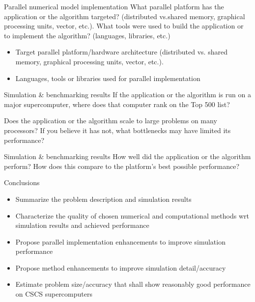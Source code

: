 \documentclass[aspectratio=43]{beamer}
\begin{document}
\begin{frame}[fragile]{Parallel numerical model implementation}
What parallel platform has the application or the algorithm targeted? (distributed vs.shared memory, graphical processing units, vector, etc.). What tools were used to build the application or to implement the algorithm? (languages, libraries, etc.)
    \bigskip 
    \begin{itemize}
     \item Target parallel platform/hardware architecture (distributed vs. shared memory,
           graphical processing units, vector, etc.).
    \item Languages, tools or libraries used for parallel implementation
     \end{itemize}
\end{frame}
\begin{frame}[fragile]{Simulation \& benchmarking results}
If the application or the algorithm is run on a major supercomputer, where does that computer rank on the Top 500 list?

\bigskip

Does the application or the algorithm scale to large problems on many processors? If you believe it has not, what bottlenecks may have limited its performance?

\end{frame}
\begin{frame}[fragile]{Simulation \& benchmarking results}
How well did the application or the algorithm perform? How does this compare to the platform’s best possible performance?
\end{frame}
\begin{frame}[fragile]{Conclusions}
    \begin{itemize}
\item Summarize the problem description and simulation results
\item  Characterize the quality of chosen numerical and computational methods wrt simulation results and achieved performance
\item Propose parallel implementation enhancements to improve simulation performance
\item Propose method enhancements to improve simulation detail/accuracy
\item Estimate problem size/accuracy that shall show reasonably good performance on CSCS
supercomputers
     \end{itemize}

\end{frame}
\end{document}
